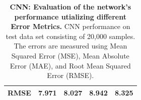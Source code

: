 \documentclass[a4paper, UKenglish, 11pt]{uiomaster}
\begin{document}
\begin{table}[!htb]
\begin{tabular}{l|cccc|}
\multicolumn{1}{|l|}{\cellcolor[HTML]{EFEFEF}RMSE} & \multicolumn{1}{c|}{7.971}                                                                                  & \multicolumn{1}{c|}{8.027}                                                                                   & \multicolumn{1}{c|}{8.942}                                                                                   & 8.325                                                                                                              \\ \hline
\end{tabular}
\caption{\textbf{CNN: Evaluation of the network's performance utializing different Error Metrics.} \newline
CNN performance on test data set consisting of 20,000 samples. The errors are measured using Mean Squared Error (MSE), Mean Absolute Error (MAE), and Root Mean Squared Error (RMSE).}
\label{table:error_multiple_dipoles}
\end{table}

%
\end{document}
